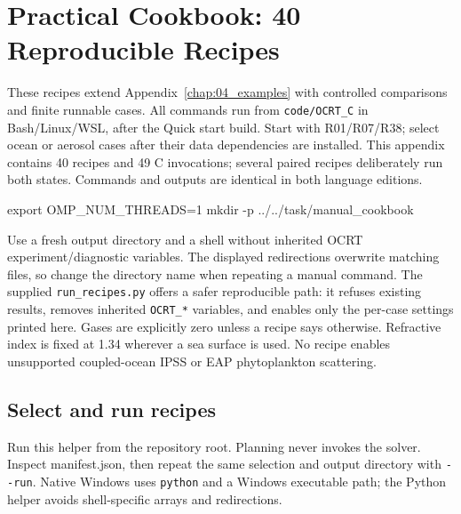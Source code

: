 
\chapter{Practical Cookbook: 40 Reproducible Recipes}

\label{chap:09_cookbook}

These recipes extend Appendix~\ref{chap:04_examples} with controlled comparisons and finite runnable cases. All commands run from \texttt{code/\allowbreak{}OCRT\_\allowbreak{}C} in Bash/Linux/WSL, after the Quick start build. Start with R01/R07/R38; select ocean or aerosol cases after their data dependencies are installed. This appendix contains 40 recipes and 49 C invocations; several paired recipes deliberately run both states. Commands and outputs are identical in both language editions.

\noindent\begin{minipage}{\linewidth}
\begin{ManualCode}

export OMP_NUM_THREADS=1
mkdir -p ../../task/manual_cookbook

\end{ManualCode}
\end{minipage}\par

Use a fresh output directory and a shell without inherited OCRT experiment/diagnostic variables. The displayed redirections overwrite matching files, so change the directory name when repeating a manual command. The supplied \texttt{run\_\allowbreak{}recipes.py} offers a safer reproducible path: it refuses existing results, removes inherited \texttt{OCRT\_\allowbreak{}*} variables, and enables only the per-case settings printed here. Gases are explicitly zero unless a recipe says otherwise. Refractive index is fixed at 1.34 wherever a sea surface is used. No recipe enables unsupported coupled-ocean IPSS or EAP phytoplankton scattering.

\section{Select and run recipes}
\label{sec:auto:09_cookbook:1}

Run this helper from the repository root. Planning never invokes the solver. Inspect manifest.json, then repeat the same selection and output directory with \texttt{-\allowbreak{}-\allowbreak{}run}. Native Windows uses \texttt{python} and a Windows executable path; the Python helper avoids shell-specific arrays and redirections.

